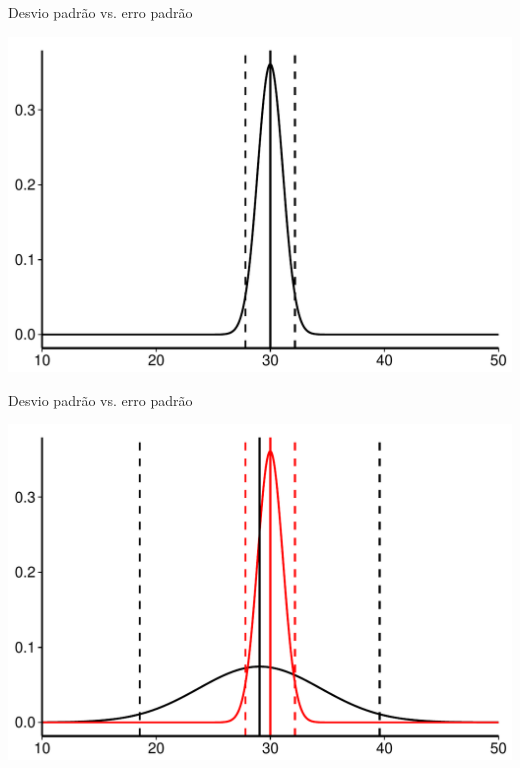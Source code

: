 \documentclass{beamer}\usepackage[]{graphicx}\usepackage[]{color}
\makeatletter
\def\maxwidth{ %
  \ifdim\Gin@nat@width>\linewidth
    \linewidth
  \else
    \Gin@nat@width
  \fi
}
\newenvironment{knitrout}{}{} %
\renewenvironment{knitrout}{\setlength{\topsep}{0mm}}{}
\makeatother
\begin{document}
\begin{frame}[fragile]{Desvio padrão vs. erro padrão}

\begin{knitrout}
\color{fgcolor}
\includegraphics[width=\maxwidth,height=0.7\textheight]{figure/desv_err_plot2-1} 

\end{knitrout}

\end{frame} 

\begin{frame}[fragile]{Desvio padrão vs. erro padrão}

\begin{knitrout}
\color{fgcolor}
\includegraphics[width=\maxwidth,height=0.7\textheight]{figure/desv_err_plot3-1} 

\end{knitrout}

\end{frame} 
\end{document}

